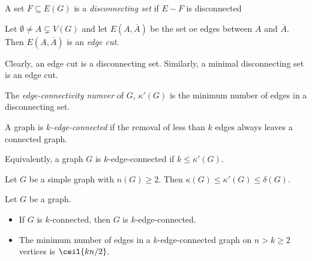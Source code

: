 \begin{definition}
    A set $F \subseteq E(G)$ is a \emph{disconnecting set}
    if $E - F$ is disconnected
\end{definition}

\begin{definition}
    Let $\emptyset \neq A \subsetneq V(G)$ and let $E(A, \overline{A})$ be 
    the set oe edges between $A$ and $\overline{A}$. Then 
    $E(A, \overline{A})$ is an \emph{edge cut}.
\end{definition}

Clearly, an edge cut is a disconnecting set. Similarly, 
a minimal disconnecting set is an edge cut.

\begin{definition}
    The \emph{edge-connectivity numver} of $G$, 
    $\kappa'(G)$ is the minimum number of edges in a 
    disconnecting set.
\end{definition}

\begin{definition}
    A graph is \emph{$k$-edge-connected}
    if the removal of less than $k$ edges always leaves a connected graph.
\end{definition}

Equivalently, a graph $G$ is $k$-edge-connected if $k \le \kappa'(G)$.

\begin{theorem}
    Let $G$ be a simple graph with $n(G) \ge 2$. Then 
    $\kappa(G) \le \kappa'(G) \le \delta(G)$.
\end{theorem}


\begin{corollary} Let $G$ be a graph.
    \begin{itemize}
        \item If $G$ is $k$-connected, then $G$ is 
        $k$-edge-connected.
        \item The minimum number of edges in a $k$-edge-connected
        graph on $n > k \ge 2$ vertices is $\ceil{kn/2}$.
    \end{itemize}
\end{corollary}


